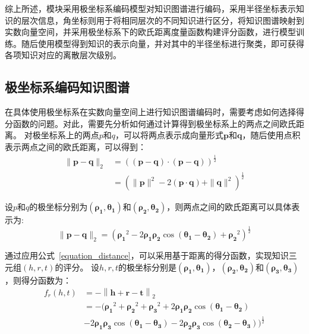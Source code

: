 \documentclass[algorithmlist, AutoFakeBold, AutoFakeSlant, figurelist, tablelist, nomlist, masters]{seuthesix}
\begin{document}
综上所述，模块采用极坐标系编码模型对知识图谱进行编码，采用半径坐标表示知识的层次信息，角坐标则用于将相同层次的不同知识进行区分，将知识图谱映射到实数向量空间，并采用极坐标系下的欧氏距离度量函数构建评分函数，进行模型训练。随后使用模型得到知识的表示向量，并对其中的半径坐标进行聚类，即可获得各项知识对应的离散层次级别。

\subsection{极坐标系编码知识图谱}
在具体使用极坐标系在实数向量空间上进行知识图谱编码时，需要考虑如何选择得分函数的问题。对此，需要先分析如何通过计算得到极坐标系上的两点之间欧氏距离。
对极坐标系上的两点$p$和$q$，可以将两点表示成向量形式$\bm{p}$和$\bm{q}$，随后使用点积表示两点之间的欧氏距离，可以得到：
\begin{equation}
  \begin{aligned}
  \|\bm{p}-\bm{q}\|_2 & =\left((\bm{p}-\bm{q}) \cdot(\bm{p}-\bm{q})\right)^{\frac{1}{2}} \\
  & =\left(\|\bm{p}\|^2-2(\bm{p} \cdot \bm{q})+\|\bm{q}\|^2\right)^{\frac{1}{2}}
  \end{aligned}
\end{equation}

设$p$和$q$的极坐标分别为$(\bm{\rho_1}, \bm{\theta_1})$和$(\bm{\rho_2}, \bm{\theta_2})$，则两点之间的欧氏距离可以具体表示为:
\begin{equation}
  \|\bm{p}-\bm{q}\|_2=\left(\bm{\rho_1}^2-2 \bm{\rho_1} \bm{\rho_2} \cos \left(\bm{\theta_1}-\bm{\theta_2}\right)+\bm{\rho_2}^2\right)^{\frac{1}{2}}
  \label{equation_distance}
\end{equation}

通过应用公式~\ref{equation_distance}，可以采用基于距离的得分函数，实现知识三元组$\left(h, r, t\right)$的评分。
设$h, r, t$的极坐标分别是$\left(\bm{\rho_1}, \bm{\theta_1}\right)$，$\left(\bm{\rho_2}, \bm{\theta_2}\right)$和$\left(\bm{\rho_3}, \bm{\theta_3}\right)$，则得分函数为：
\begin{equation}
  \begin{aligned}
    f_r\left(h, t\right) & =-\left\|\bm{h}+\bm{r}-\bm{t}\right\|_2 \\
    & =-(\bm{\rho_1}^2+\bm{\rho_2}^2+\bm{\rho_3}^2 + 2 \bm{\rho_1} \bm{\rho_2} \cos \left(\bm{\theta_1}-\bm{\theta_2}\right) \\
    & - 2 \bm{\rho_1} \bm{\rho_3} \cos \left(\bm{\theta_1}-\bm{\theta_3}\right) - 2 \bm{\rho_2} \bm{\rho_3} \cos \left(\bm{\theta_2}-\bm{\theta_3}\right))^{\frac{1}{2}}
  \end{aligned}
\end{equation}
\end{document}
